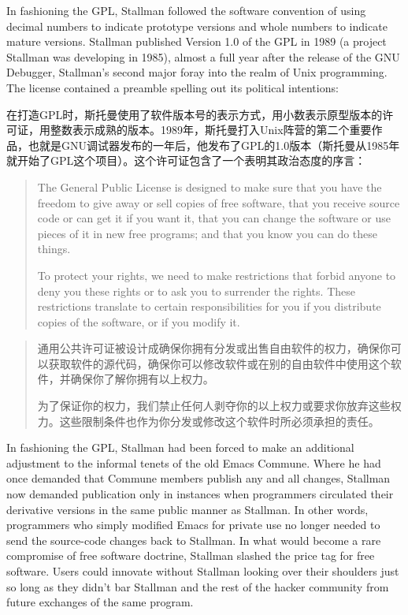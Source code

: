 \ifdefined\eng
In fashioning the GPL, Stallman followed the software convention of using decimal numbers to indicate prototype versions and whole numbers to indicate mature versions. Stallman published Version 1.0 of the GPL in 1989 (a project Stallman was developing in 1985), almost a full year after the release of the GNU Debugger, Stallman's second major foray into the realm of Unix programming. The license contained a preamble spelling out its political intentions:
\fi

\ifdefined\chs
在打造GPL时，斯托曼使用了软件版本号的表示方式，用小数表示原型版本的许可证，用整数表示成熟的版本。1989年，斯托曼打入Unix阵营的第二个重要作品，也就是GNU调试器发布的一年后，他发布了GPL的1.0版本（斯托曼从1985年就开始了GPL这个项目）。这个许可证包含了一个表明其政治态度的序言：
\fi

\ifdefined\eng
\begin{quote}
The General Public License is designed to make sure that you have the freedom to give away or sell copies of free software, that you receive source code or can get it if you want it, that you can change the software or use pieces of it in new free programs; and that you know you can do these things.

To protect your rights, we need to make restrictions that forbid anyone to deny you these rights or to ask you to surrender the rights. These restrictions translate to certain responsibilities for you if you distribute copies of the software, or if you modify it.
\end{quote}
\fi

\ifdefined\chs
\begin{quote}
通用公共许可证被设计成确保你拥有分发或出售自由软件的权力，确保你可以获取软件的源代码，确保你可以修改软件或在别的自由软件中使用这个软件，并确保你了解你拥有以上权力。

为了保证你的权力，我们禁止任何人剥夺你的以上权力或要求你放弃这些权力。这些限制条件也作为你分发或修改这个软件时所必须承担的责任。
\end{quote}
\fi

\ifdefined\eng
In fashioning the GPL, Stallman had been forced to make an additional adjustment to the informal tenets of the old Emacs Commune. Where he had once demanded that Commune members publish any and all changes, Stallman now demanded publication only in instances when programmers circulated their derivative versions in the same public manner as Stallman. In other words, programmers who simply modified Emacs for private use no longer needed to send the source-code changes back to Stallman. In what would become a rare compromise of free software doctrine, Stallman slashed the price tag for free software. Users could innovate without Stallman looking over their shoulders just so long as they didn't bar Stallman and the rest of the hacker community from future exchanges of the same program.
\fi

